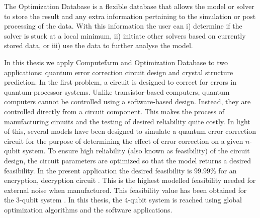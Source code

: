 The Optimization Database is a flexible database that allows the model or solver to store the result and any extra information pertaining to the simulation or post processing of the data. With this information the user can i) determine if the solver is stuck at a local minimum, ii) initiate other solvers based on currently stored data, or iii) use the data to further analyse the model. 

In this thesis we apply Computefarm and Optimization Database to two applications: quantum error correction circuit design and crystal structure prediction. In the first problem, a circuit is designed to correct for errors in quantum-processor systems. Unlike transistor-based computers, quantum computers cannot be controlled using a software-based design. Instead, they are controlled directly from a circuit component. This makes the process of manufacturing circuits and the testing of desired reliability quite costly. In light of this, several models have been designed to simulate a quantum error correction circuit for the purpose of determining the effect of error correction on a given $n$-qubit system. To ensure high reliability (also known as feasibility) of the circuit design, the circuit parameters are optimized so that the model returns a desired feasibility. In the present application the desired feasibility is $99.99\%$ for an encryption, decryption circuit \cite{Barends2014,Ghosh2013}. This is the highest modelled feasibility needed for external noise when manufactured. This feasibility value has been obtained for the $3$-qubit system \cite{Zahedinejad2014}. In this thesis, the $4$-qubit system is reached using global optimization algorithms and the software applications.   

